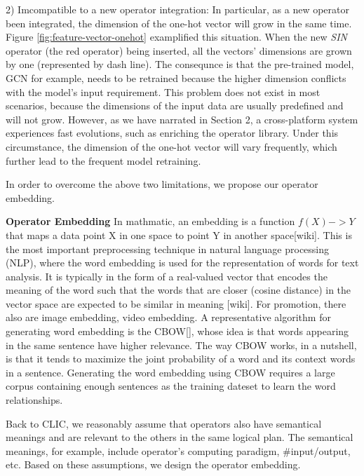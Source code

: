 2) Imcompatible to a new operator integration: 
In particular, as a new operator been integrated, the dimension of the one-hot vector will grow in the same time. 
Figure \ref{fig:feature-vector-onehot} examplified this situation. 
When the new \textit{SIN} operator (the red operator) being inserted, all the vectors' dimensions are grown by one (represented by dash line).
The consequnce is that the pre-trained model, GCN for example, needs to be retrained because the higher dimension conflicts with the model's input requirement.
This problem does not exist in most scenarios, because the dimensions of the input data are usually predefined and will not grow.
However, as we have narrated in Section 2, a cross-platform system experiences fast evolutions, such as enriching the operator library.
Under this circumstance, the dimension of the one-hot vector will vary frequently, which further lead to the frequent model retraining.


In order to overcome the above two limitations, we propose our operator embedding.

\textbf{Operator Embedding}
In mathmatic, an embedding is a function $f(X) -> Y$ that maps a data point X in one space to point Y in another space[wiki]. 
This is the most important preprocessing technique in natural language processing (NLP), where the word embedding is used for the representation of words for text analysis. 
It is typically in the form of a real-valued vector that encodes the meaning of the word such that the words that are closer (cosine distance) in the vector space are expected to be similar in meaning [wiki]. 
For promotion, there also are image embedding, video embedding. 
A representative algorithm for generating word embedding is the CBOW[], whose idea is that words appearing in the same sentence have higher relevance. 
The way CBOW works, in a nutshell, is that it tends to maximize the joint probability of a word and its context words in a sentence. 
Generating the word embedding using CBOW requires a large corpus containing enough sentences as the training dateset to learn the word relationships.

Back to CLIC, we reasonably assume that operators also have semantical meanings and are relevant to the others in the same logical plan.
The semantical meanings, for example, include operator's computing paradigm, \#input/output, etc.
Based on these assumptions, we design the operator embedding.

